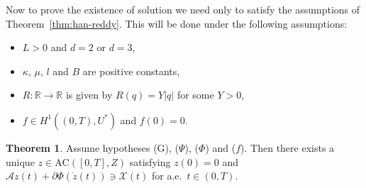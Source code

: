 \documentclass[a4paper,10pt,twoside]{amsbook}
\numberwithin{section}{chapter}
\numberwithin{equation}{chapter}
\theoremstyle{definition}
\newtheorem{thm}[prop]{Theorem}
\begin{document}
Now to prove the existence of solution we need only to satisfy the assumptions of Theorem~\ref{thm:han-reddy}. This will be done under the following assumptions:
\begin{itemize}
\item[(G)] $L>0$ and $d=2$ or $d=3$,
\item[($\Psi$)] $\kappa$, $\mu$, $l$ and $B$ are positive constants,
\item[($\Phi$)] $R\colon\mathbb{R}\to\mathbb{R}$ is given by $R(q)=Y|q|$ for some $Y>0$,
\item[($f$)] $f\in H^1((0,T),U^*)$ and $f(0)=0$.
\end{itemize}
\begin{thm}
Assume hypotheses (G), ($\Psi$), ($\Phi$) and ($f$). Then there exists a unique $z\in\text{AC}([0,T],Z)$ satisfying $z(0)=0$ and $\mathcal{A}z(t)+\partial\Phi(\dot z(t))\ni\mathcal{X}(t)$ for a.e.\ $t\in(0,T)$.
\end{thm}
\end{document}

